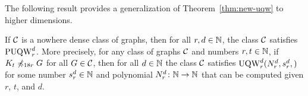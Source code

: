 	The following result provides a generalization of Theorem~\ref{thm:new-uqw} to higher dimensions.

\begin{theorem}[$\star$]\label{thm:uqw-tuples}If $\cal C$
	is a nowhere dense class of graphs,
	then for all $r,d\in\N$,
	the class $\cal C$ satisfies
	 $\puqw^d_r$.
	More precisely, for any class of graphs $\cal C$ and numbers $r,t\in\N$,
	if  	${K_t\not\minor_{18r} G}$ for all $G\in \cal C$,
then for all $d\in \N$ the class $\cal C$ satisfies $\uqw^d_{r}(N^d_r,s^d_r,)$	for 
some number $s^d_r\in \N$ and polynomial $N^d_r\from \N\to\N$ that can be computed given $r$, $t$, and $d$.
\end{theorem}

